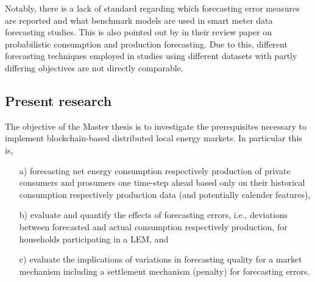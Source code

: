 Notably, there is a lack of standard regarding which forecasting error measures are reported and what benchmark models are used in smart meter data forecasting studies. This is also pointed out by \citet{Meer:2018} in their review paper on probabilistic consumption and production forecasting. Due to this, different forecasting techniques employed in studies using different datasets with partly differing objectives are not directly comparable. 




\subsection{Present research}\label{Sec:Intro;Subsec:Present}

The objective of the Master thesis is to investigate the prerequisites necessary to implement blockchain-based distributed local energy markets. In particular this is,
\begin{itemize}
    \item[a)] forecasting net energy consumption respectively production of private consumers and prosumers one time-step ahead based only on their historical consumption respectively production data (and potentially calender features),
    \item[b)] evaluate and quantify the effects of forecasting errors, i.e., deviations between forecasted and actual consumption respectively production, for households participating in a LEM, and
    \item[c)] evaluate the implications of variations in forecasting quality for a market mechanism including a settlement mechanism (penalty) for forecasting errors.
\end{itemize}

